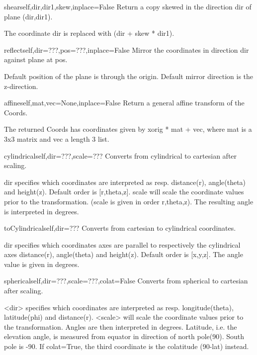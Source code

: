 \begin{funcdesc}{shear}{self,dir,dir1,skew,inplace=False}
Return a copy skewed in the direction dir of plane (dir,dir1).

        The coordinate dir is replaced with (dir + skew * dir1).
        
\end{funcdesc}

\begin{funcdesc}{reflect}{self,dir=???,pos=???,inplace=False}
Mirror the coordinates in direction dir against plane at pos.

        Default position of the plane is through the origin.
        Default mirror direction is the z-direction.
        
\end{funcdesc}

\begin{funcdesc}{affine}{self,mat,vec=None,inplace=False}
Return a general affine transform of the Coords.

        The returned Coords has coordinates given by xorig * mat + vec,
        where mat is a 3x3 matrix and vec a length 3 list.
        
\end{funcdesc}

\begin{funcdesc}{cylindrical}{self,dir=???,scale=???}
Converts from cylindrical to cartesian after scaling.

        dir specifies which coordinates are interpreted as resp.
        distance(r), angle(theta) and height(z). Default order is [r,theta,z].
        scale will scale the coordinate values prior to the transformation.
        (scale is given in order r,theta,z).
        The resulting angle is interpreted in degrees.
        
\end{funcdesc}

\begin{funcdesc}{toCylindrical}{self,dir=???}
Converts from cartesian to cylindrical coordinates.

        dir specifies which coordinates axes are parallel to respectively the
        cylindrical axes distance(r), angle(theta) and height(z). Default
        order is [x,y,z].
        The angle value is given in degrees.
        
\end{funcdesc}

\begin{funcdesc}{spherical}{self,dir=???,scale=???,colat=False}
Converts from spherical to cartesian after scaling.

        <dir> specifies which coordinates are interpreted as resp.
        longitude(theta), latitude(phi) and distance(r).
        <scale> will scale the coordinate values prior to the transformation.
        Angles are then interpreted in degrees.
        Latitude, i.e. the elevation angle, is measured from equator in
        direction of north pole(90). South pole is -90.
        If colat=True, the third coordinate is the colatitude (90-lat) instead.
        
\end{funcdesc}

